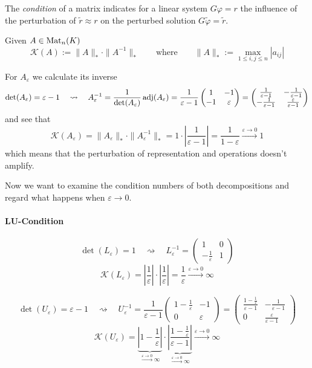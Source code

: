 The \emph{condition} of a matrix indicates for a linear system \(G\varphi = r\) the influence of the perturbation of \(\widetilde{r} \approx r\) on the perturbed solution \(G\widetilde{\varphi} = \widetilde{r}\).
\begin{definition}
   Given \(A \in \operatorname{Mat}_n(K)\)
   \[\mathcal{K}(A) := \|A\|_{\ast} \cdot \|A^{-1}\|_{\ast} \qquad\text{where}\qquad \|A\|_{\ast} := \max_{1 \leq i,j \leq n} |a_{ij}|\]
\end{definition}
\begin{remark}
   For \(A_\varepsilon\) we calculate its inverse
   \[\det(A_\varepsilon) = \varepsilon - 1 \quad\rightsquigarrow\quad A_\varepsilon^{-1} = \frac{1}{\det(A_\varepsilon)}\operatorname{adj}(A_\varepsilon) = \frac{1}{\varepsilon - 1}\begin{pmatrix}1&-1\\-1&\varepsilon\end{pmatrix} = \begin{pmatrix}\frac{1}{\varepsilon - 1}& -\frac{1}{\varepsilon - 1}\\-\frac{1}{\varepsilon - 1}& \frac{\varepsilon}{\varepsilon - 1}\end{pmatrix}\]
   and see that
   \[\mathcal{K}(A_\varepsilon) = \|A_\varepsilon\|_\ast \cdot \|A_\varepsilon^{-1}\|_\ast = 1 \cdot \left|\frac{1}{\varepsilon - 1}\right| = \frac{1}{1 - \varepsilon} \xrightarrow{\varepsilon \to 0} 1\]
   which means that the perturbation of representation and operations doesn't amplify.
\end{remark}

Now we want to examine the condition numbers of both decompositions and regard what happens when \(\varepsilon \to 0\).
\paragraph{LU-Condition}
\[\det(L_\varepsilon) = 1 \quad\rightsquigarrow\quad L_\varepsilon^{-1} = \begin{pmatrix}1&0\\-\frac{1}{\varepsilon}&1\end{pmatrix}\]
\[\mathcal{K}(L_\varepsilon) = \left|\frac{1}{\varepsilon}\right| \cdot \left|\frac{1}{\varepsilon}\right| = \frac{1}{\varepsilon} \xrightarrow{\varepsilon \to 0} \infty\]

\[\det(U_\varepsilon) = \varepsilon - 1 \quad\rightsquigarrow\quad U_\varepsilon^{-1} = \frac{1}{\varepsilon - 1} \begin{pmatrix}1-\frac{1}{\varepsilon}&-1\\0&\varepsilon\end{pmatrix} = \begin{pmatrix}\frac{1 - \frac{1}{\varepsilon}}{\varepsilon - 1} & -\frac{1}{\varepsilon - 1}\\0&\frac{\varepsilon}{\varepsilon - 1}\end{pmatrix}\]
\[\mathcal{K}(U_\varepsilon) = \underbrace{\left|1 - \frac{1}{\varepsilon}\right|}_{\xrightarrow{\varepsilon \to 0} \infty} \cdot \underbrace{\left|\frac{1 - \frac{1}{\varepsilon}}{\varepsilon - 1}\right|}_{\xrightarrow{\varepsilon \to 0} \infty} \xrightarrow{\varepsilon \to 0} \infty\]

